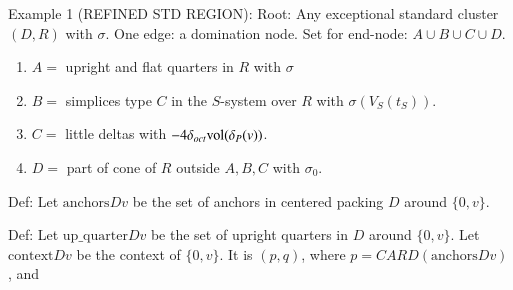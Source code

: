 Example 1 (REFINED STD REGION):
Root: Any exceptional standard cluster $(D,R)$ with $\sigma$.
One edge:  a domination node.
Set for end-node: $A \cup B \cup C \cup D$.
   \begin{enumerate}
   \item $ A = $ upright and flat quarters in $R$ with $\sigma$
   \item $ B = $ simplices type $C$ in the $S$-system over $R$ with $\sigma(V_S(t_S))$.
   \item $ C = $ little deltas with $-4\delta_{oct} {\operatorname{vol}}(\delta_P(v))$.
   \item $ D = $ part of cone of $R$ outside $A,B,C$ with $\sigma_0$.
   \end{enumerate}

Def: Let $\text{anchors} D v$ be the set of anchors in centered
packing $D$ around $\{0,v\}$.

Def: Let $\text{up\_quarter} D v$ be the set of upright quarters in $D$
around $\{0,v\}$.  Let $\text{context} D v$ be the context of $\{0,v\}$.
It is $(p,q)$, where $p = CARD(\text{anchors}D v)$, and
